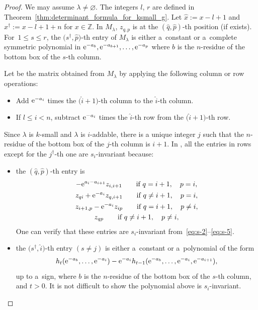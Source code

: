 \documentclass[pdftex]{sigma}
\numberwithin{equation}{section}
\newcommand{\la}{\lambda}
\def\ZZ{\mathord{\mathbb{Z}}}
\theoremstyle{definition}
\begin{document}
\begin{proof}
We may assume $\la\ne \varnothing$.
The integers $l$, $r$ are defined in Theorem~\ref{thm:determinant_formula_for_ksmall_g}.
Let $\hat{x}:=x-l+1$ and $x^\dagger:=x-l+1+n$ for $x\in \ZZ$.
In $M_\lambda$, $z_{q,p}$ is at the $(\hat{q},\hat{p})$-th position (if exists).
For~${1\le s\le r}$, the
$\bigl(s^\dagger,\hat{p}\bigr)$-th entry of $M_\lambda$ is either a~constant or a~complete symmetric polynomial in ${\rm e}^{-a_{b}},{\rm e}^{-a_{b+1}},\dots,{\rm e}^{-a_{p}}$ where $b$ is the $n$-residue of the bottom box of the $s$-th column.

Let  be the matrix obtained from $M_\lambda$ by applying the following column or row operations:
\begin{itemize}\itemsep=0pt
 \item[(a)] Add ${\rm e}^{-a_{i}}$ times the $\big(\hat{i}+1\big)$-th column to the $\hat{i}$-th column.
 \item[(b)] If $l\le i<n$, subtract ${\rm e}^{-a_{i}}$ times the $\hat{i}$-th row from the $\big(\hat{i}+1\big)$-th row.
\end{itemize}
Since $\lambda$ is $k$-small and $\la$ is $i$-addable, there is
a unique integer $j$ such that the $n$-residue of the bottom box of the $j$-th column is $i + 1$.
In , all the entries in rows except for the $j^\dagger$-th one are $s_{i}$-invariant because:
\begin{itemize}
\itemsep=0pt
 \item the $(\hat{q},\hat{p})$-th entry is
 \begin{gather*}
 -{\rm e}^{a_i-a_{i+1}}z_{i,i+1}\qquad \text{if} \ q=i+1,\quad p=i,\\
 z_{qi}+{\rm e}^{-a_i}z_{q,i+1}\qquad \text{if} \ q\neq i+1,\quad p=i,\\
 z_{i+1,p}-{\rm e}^{-a_i}z_{ip} \qquad \text{if} \ q=i+1,\quad p\neq i,\\
 z_{qp} \qquad \text{if} \ q\neq i+1,\quad p\neq i,
 \end{gather*}
One can verify that these entries are $s_i$-invariant from~\eqref{eq:s-2}--\eqref{eq:s-5}.
\item the $\bigl(s^\dagger,\hat{i}\bigr)$-th entry $(s\neq j)$ is either a~constant or a~polynomial of the form
\[
h_t({\rm e}^{-a_{b}},\dots,{\rm e}^{-a_i})-{\rm e}^{-a_i}h_{t-1}({\rm e}^{-a_{b}},\dots,{\rm e}^{-a_i},{\rm e}^{-a_{i+1}}),
\]
up to a~sign,
where $b$ is the $n$-residue of the bottom box of the $s$-th column, and $t>0$.
It is not difficult to show the polynomial above is
$s_i$-invariant.


\end{itemize}
\end{proof}
\end{document}
